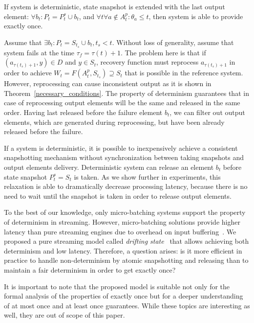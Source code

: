 \begin{theorem}
\label{determinism}
If system is deterministic, state snapshot is extended with the last output element: $\forall{b_t}:P_t=P^{s}_t \cup b_t$, and $\forall{t}\forall{a}\notin{A^{p}_t} : \theta_a \leq t$, then system is able to provide exactly once.
\end{theorem}
\begin{sketch}
Assume that $\exists{b_t}:P_t = S_{t_s} \cup b_t, t_s < t$. Without loss of generality, assume that system fails at the time $\tau_f = \tau(t)+1$. The problem here is that if $(a_{\tau(t_s)+1},y)\in{D}$ and $y\in{S_t}$, recovery function must reprocess $a_{\tau(t_s)+1}$ in order to achieve $W_t=F(A^{p}_t,S_{t_s})\supseteq{S_t}$ that is possible in the reference system. However, reprocessing can cause inconsistent output as it is shown in Theorem~\ref{necessary_conditions}. The property of determinism guarantees that in case of reprocessing output elements will be the same and released in the same order. Having last released before the failure element $b_t$, we can filter out output elements, which are generated during reprocessing, but have been already released before the failure.
\end{sketch}

If a system is deterministic, it is possible to inexpensively achieve a consistent snapshotting mechanism without synchronization between taking snapshots and output elements delivery. Deterministic system can release an element $b_t$ before state snapshot $P^{s}_t=S_t$ is taken. As we show further in experiments, this relaxation is able to dramatically decrease processing latency, because there is no need to wait until the snapshot is taken in order to release output elements.

To the best of our knowledge, only micro-batching systems support the property of determinism in streaming. However, micro-batching solutions provide higher latency than pure streaming engines due to overhead on input buffering~\cite{karimov2018benchmarking}. We proposed a pure streaming model called {\em drifting state}~\cite{we2018adbis} that allows achieving both determinism and low latency. Therefore, a question arises: is it more efficient in practice to handle non-determinism by atomic snapshotting and releasing than to maintain a fair determinism in order to get exactly once? 

It is important to note that the proposed model is suitable not only for the formal analysis of the properties of exactly once but for a deeper understanding of at most once and at least once guarantees. While these topics are interesting as well, they are out of scope of this paper. 

